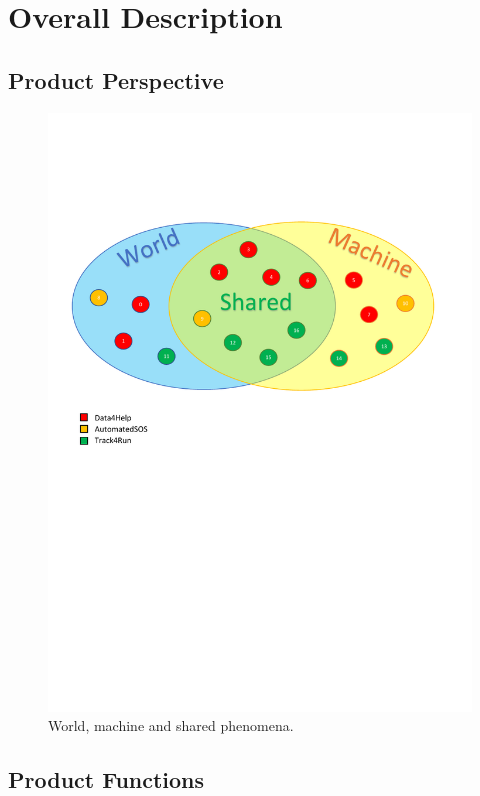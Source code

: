 \documentclass[a4paper]{article}
\begin{document}
    \section{Overall Description}
    
    \subsection{Product Perspective}
    
    \begin{figure}[h!]
        \centering
        \includegraphics[width=\linewidth]{worldMachineShared-small}
        \caption{World, machine and shared phenomena.}
        \label{fig:my_label}
    \end{figure}
    
    
    \subsection{Product Functions}
    
\end{document}
